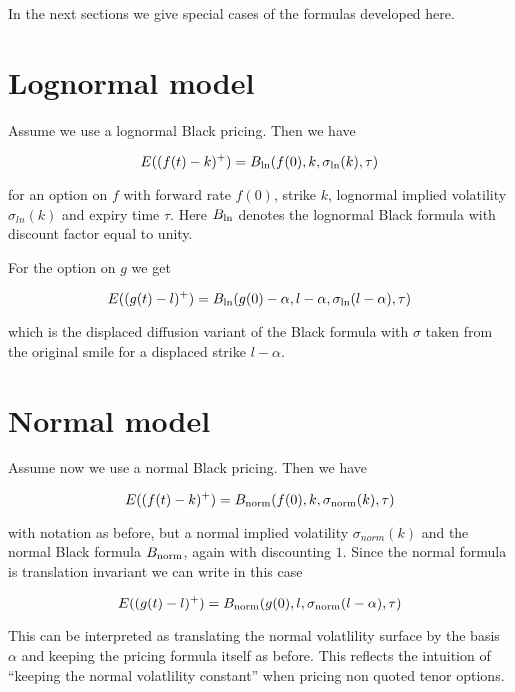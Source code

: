 \documentclass{amsart}
\theoremstyle{plain}
\numberwithin{equation}{section}
\begin{document}
In the next sections we give special cases of the formulas developed here.

\section{Lognormal model}

Assume we use a lognormal Black pricing. Then we have

\begin{equation}
E( (f(t)-k)^+ ) = B_{\textnormal{ln}}(f(0),k,\sigma_{\textnormal{ln}}(k),\tau)
\end{equation}

for an option on $f$ with forward rate $f(0)$, strike $k$, lognormal implied volatility $\sigma_{ln}(k)$ and expiry time $\tau$. Here $B_{\textnormal{ln}}$ denotes the lognormal Black formula with discount factor equal to unity. 

For the option on $g$ we get

\begin{equation}
E( (g(t)-l)^+ ) = B_{\textnormal{ln}}(g(0)-\alpha,l-\alpha,\sigma_{\textnormal{ln}}(l-\alpha),\tau)
\end{equation}

which is the displaced diffusion variant of the Black formula with $\sigma$ taken from the original smile for a displaced strike $l-\alpha$.

\section{Normal model}

Assume now we use a normal Black pricing. Then we have

\begin{equation}
E( (f(t)-k)^+ ) = B_{\textnormal{norm}}(f(0),k,\sigma_{\textnormal{norm}}(k),\tau)
\end{equation}

with notation as before, but a normal implied volatility $\sigma_{norm}(k)$ and the normal Black formula $B_{\textnormal{norm}}$, again with discounting $1$. Since the normal formula is translation invariant we can write in this case

\begin{equation}
E( (g(t)-l)^+ ) = B_{\textnormal{norm}}(g(0),l,\sigma_{\textnormal{norm}}(l-\alpha),\tau)
\end{equation}

This can be interpreted as translating the normal volatlility surface by the basis $\alpha$ and keeping the pricing formula itself as before. This reflects the intuition of ``keeping the normal volatlility constant'' when pricing non quoted tenor options.
\end{document}
